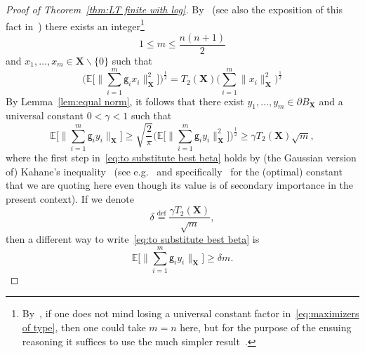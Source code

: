 \documentclass[11pt,reqno]{amsart}
\renewcommand{\le}{\leqslant}
\renewcommand{\ge}{\geqslant}
\renewcommand{\setminus}{\smallsetminus}
\renewcommand{\d}{\delta}
\newcommand{\X}{\mathbf X}
\theoremstyle{remark}
\newcommand{\E}{\mathbb{ E}}
\newcommand{\eqdef}{\stackrel{\mathrm{def}}{=}}
\renewcommand{\1}{\mathbf 1}
\newcommand{\g}{\mathsf{g}}
\begin{document}
\begin{proof}[Proof of Theorem~\ref{thm:LT finite with log}]
 By~\cite[Lemma~6.1]{FLM77} (see also the exposition of this fact in~\cite[page~546]{JN10}) there exists an integer\footnote{By~\cite{Tom79}, if one does not mind losing a universal constant factor in~\eqref{eq:maximizers of type}, then one could take $m=n$ here, but  for the purpose of the ensuing reasoning it suffices to use the much simpler result~\cite[Lemma~6.1]{FLM77}.}
 \begin{equation}\label{eq:m quadratic}
 1\le m\le \frac{n(n+1)}{2}\end{equation} and $x_1,\ldots,x_m\in \X\setminus \{0\}$ such that
\begin{equation}\label{eq:maximizers of type}
\Bigg(\E\bigg[\Big\|\sum_{i=1}^m \g_i x_i\Big\|_{\X}^2\bigg]\Bigg)^{\frac12}= T_2(\X) \bigg(\sum_{i=1}^m \|x_i\|_{\X}^2\bigg)^{\frac12}
\end{equation}
By Lemma~\ref{lem:equal norm}, it follows that there  exist $y_1,\ldots, y_m\in \partial B_\X$ and a universal constant $0<\gamma<1$ such that
\begin{equation}\label{eq:to substitute best beta}
\E\bigg[\Big\|\sum_{i=1}^m \g_i y_i\Big\|_{\X}\bigg]\ge \sqrt{\frac{2}{\pi}}\bigg(\E\bigg[\Big\|\sum_{i=1}^m \g_i y_i\Big\|_{\X}^2\bigg]\bigg)^{\frac12}\ge \gamma T_2(\X)\sqrt{m},
\end{equation}
where the first step in~\eqref{eq:to substitute best beta} holds by (the Gaussian version of) Kahane's inequality~\cite{Kah64} (see e.g.~\cite[Corollary~3.2]{LT91} and specifically~\cite[Corollary~3]{LO99} for the (optimal) constant that we are quoting here even though its value is of secondary importance in the present context). If we denote
\begin{equation}\label{eq:def delta RV}
\delta\eqdef \frac{\gamma T_2(\X)}{\sqrt{m}},
\end{equation}
then a different way to write~\eqref{eq:to substitute best beta} is
\begin{equation}\label{eq:conclusion for RV}
\E\bigg[\Big\|\sum_{i=1}^m \g_i y_i\Big\|_{\X}\bigg]\ge \d m.
\end{equation}



\end{proof}
\end{document}
